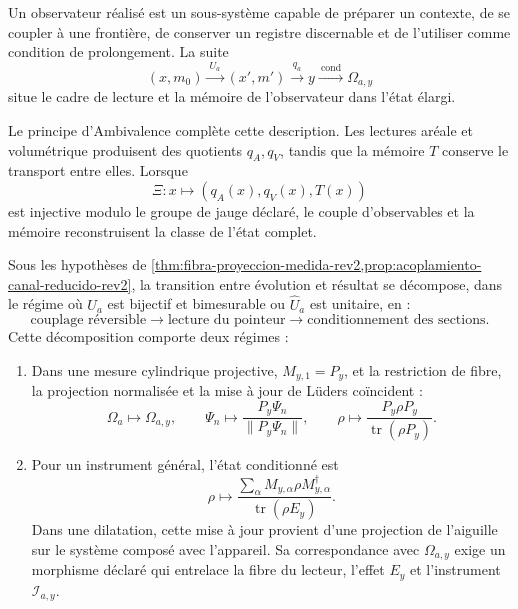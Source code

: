Un observateur réalisé est un sous-système capable de préparer un contexte, de se coupler à une frontière, de conserver un registre discernable et de l’utiliser comme condition de prolongement. La suite
\begin{equation}
 (x,m_0)
 \xrightarrow{\ U_a\ }(x',m')
 \xrightarrow{\ q_a\ }y
 \xrightarrow{\ \mathrm{cond}\ }\Omega_{a,y}
 \label{eq:secuencia-observador-rev2}
\end{equation}
situe le cadre de lecture et la mémoire de l’observateur dans l’état élargi.

Le principe d’Ambivalence complète cette description. Les lectures aréale et volumétrique produisent des quotients \(q_A,q_V\), tandis que la mémoire \(T\) conserve le transport entre elles. Lorsque
\[
 \Xi:x\longmapsto(q_A(x),q_V(x),T(x))
\]
est injective modulo le groupe de jauge déclaré, le couple d’observables et la mémoire reconstruisent la classe de l’état complet.

\begin{theorem}
\label{thm:descomposicion-medicion-rev2}
Sous les hypothèses de \cref{thm:fibra-proyeccion-medida-rev2,prop:acoplamiento-canal-reducido-rev2}, la transition entre évolution et résultat se décompose, dans le régime où \(U_a\) est bijectif et bimesurable ou \(\widehat U_a\) est unitaire, en :
\[
 \text{couplage réversible}
 \longrightarrow
 \text{lecture du pointeur}
 \longrightarrow
 \text{conditionnement des sections}.
\]
Cette décomposition comporte deux régimes :
\begin{enumerate}
\item Dans une mesure cylindrique projective, \(M_{y,1}=P_y\), et la restriction de fibre, la projection normalisée et la mise à jour de Lüders coïncident :
\[
 \Omega_a\longmapsto\Omega_{a,y},
 \qquad
 \Psi_n\longmapsto\frac{P_y\Psi_n}{\|P_y\Psi_n\|},
 \qquad
 \rho\longmapsto
 \frac{P_y\rho P_y}{\operatorname{tr}(\rho P_y)}.
\]
\item Pour un instrument général, l’état conditionné est
\[
 \rho\longmapsto
 \frac{\sum_\alpha M_{y,\alpha}\rho M_{y,\alpha}^\dagger}
 {\operatorname{tr}(\rho E_y)}.
\]
Dans une dilatation, cette mise à jour provient d’une projection de l’aiguille sur le système composé avec l’appareil. Sa correspondance avec \(\Omega_{a,y}\) exige un morphisme déclaré qui entrelace la fibre du lecteur, l’effet \(E_y\) et l’instrument \(\mathcal I_{a,y}\).
\end{enumerate}
\end{theorem}

